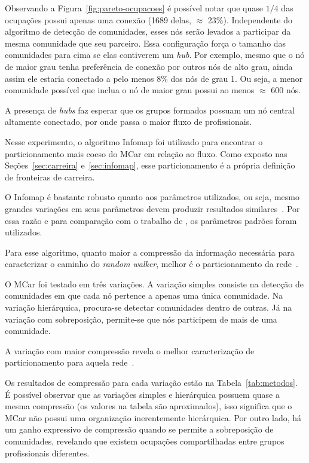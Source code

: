 \documentclass[
  article,
  11pt,
  a4paper,
  english,
  brazil,
  sumario=tradicional]{abntex2}
\begin{document}
Observando a Figura~\ref{fig:pareto-ocupacoes} é possível notar que quase $1/4$ das ocupações possui apenas uma conexão (1689 delas, $\approx$ 23\%). Independente do algoritmo de detecção de comunidades, esses nós serão levados a participar da mesma comunidade que seu parceiro. Essa configuração força o tamanho das comunidades para cima se elas contiverem um \textit{hub}. Por exemplo, mesmo que o nó de maior grau tenha preferência de conexão por outros nós de alto grau, ainda assim ele estaria conectado a pelo menos 8\% dos nós de grau 1. Ou seja, a menor comunidade possível que inclua o nó de maior grau possui ao menos $\approx$ 600 nós.

A presença de \textit{hubs} faz esperar que os grupos formados possuam um nó central altamente conectado, por onde passa o maior fluxo de profissionais.


Nesse experimento, o algoritmo Infomap foi utilizado para encontrar o particionamento mais coeso do MCar em relação ao fluxo. Como exposto nas Seções~\ref{sec:carreira} e~\ref{sec:infomap}, esse particionamento é a própria definição de fronteiras de carreira.

O Infomap é bastante robusto quanto aos parâmetros utilizados, ou seja, mesmo grandes variações em seus parâmetros devem produzir resultados similares~\cite{Kawamoto2015-ha,Lambiotte2012-fp}. Por essa razão e para comparação com o trabalho de , os parâmetros padrões foram utilizados.

Para esse algoritmo, quanto maior a compressão da informação necessária para caracterizar o caminho do \textit{random walker}, melhor é o particionamento da rede~\cite{Rosvall2009-sd}.

O MCar foi testado em três variações. A variação simples consiste na detecção de comunidades em que cada nó pertence a apenas uma única comunidade. Na variação hierárquica, procura-se detectar comunidades dentro de outras. Já na variação com sobreposição, permite-se que nós participem de mais de uma comunidade.

A variação com maior compressão revela o melhor caracterização de particionamento para aquela rede~\cite{Viamontes_Esquivel2011-it,Rosvall2011-yi}.

Os resultados de compressão para cada variação estão na Tabela~\ref{tab:metodos}. É possível observar que as variações simples e hierárquica possuem quase a mesma compressão (os valores na tabela são aproximados), isso significa que o MCar não possui uma organização inerentemente hierárquica. Por outro lado, há um ganho expressivo de compressão quando se permite a sobreposição de comunidades, revelando que existem ocupações compartilhadas entre grupos profissionais diferentes.
\end{document}
